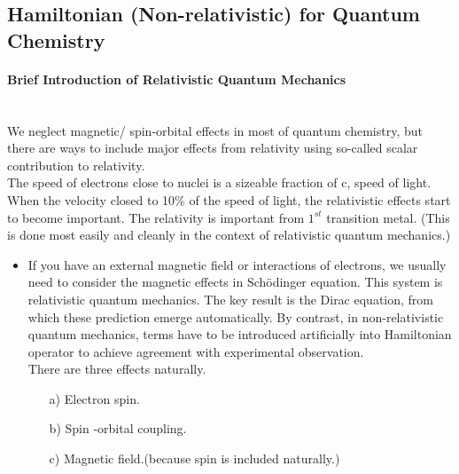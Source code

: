 \documentclass[a4paper, 12pt]{article}
\begin{document}
\subsection{Hamiltonian (Non-relativistic) for Quantum Chemistry}
\paragraph{Brief Introduction of Relativistic Quantum Mechanics}~\\
\indent We neglect magnetic/ spin-orbital effects in most of quantum chemistry, but there are ways to include major effects from relativity using so-called scalar contribution to relativity.\\
\indent The speed of electrons close to nuclei is a sizeable fraction of c, speed of light. When the velocity closed to 10\% of the speed of light, the relativistic effects start to become important. The relativity is important from $1^{st }$ transition metal. (This is done most easily and cleanly in the context of relativistic quantum mechanics.)
\begin{itemize}
\item If you have an external magnetic field or interactions of electrons, we usually need to consider the magnetic effects in Sch\"{o}dinger equation. This system is relativistic quantum mechanics. The key result is the Dirac equation, from which these prediction emerge automatically. By contrast, in non-relativistic quantum mechanics, terms have to be introduced artificially into Hamiltonian operator to achieve agreement with experimental observation.\\
\indent There are three effects naturally.
 \begin{itemize}
	\item[a)] Electron spin.
	\item[b)] Spin -orbital coupling.
	\item[c)] Magnetic field.(because spin is included naturally.)
\end{itemize}
\end{itemize}
\end{document}
